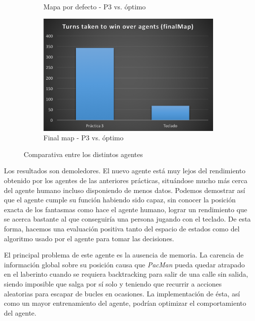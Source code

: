 \documentclass[12pt]{article}
\begin{document}
\begin{figure}[h]
\begin{subfigure}{.5\textwidth}
        \caption{Mapa por defecto - P3 vs. óptimo}
        \label{fig:sub3}
    \end{subfigure}%
    \begin{subfigure}{.5\textwidth}
        \centering
        \includegraphics[width=.85\linewidth]{fmap_d}
        \caption{Final map - P3 vs. óptimo}
        \label{fig:sub4}
    \end{subfigure}
    \caption{Comparativa entre los distintos agentes}
    \label{fig:test}
\end{figure}

Los resultados son demoledores. El nuevo agente está muy lejos del rendimiento obtenido por los agentes de las anteriores prácticas, situándose mucho más cerca del agente humano incluso disponiendo de menos datos. Podemos demostrar así que el agente cumple su función habiendo sido capaz, sin conocer la posición exacta de los fantasmas como hace el agente humano, lograr un rendimiento que se acerca bastante al que conseguiría una persona jugando con el teclado. De esta forma, hacemos una evaluación positiva tanto del espacio de estados como del algoritmo usado por el agente para tomar las decisiones.


El principal problema de este agente es la ausencia de memoria. La carencia de información global sobre su posición causa que \textit{PacMan} pueda quedar atrapado en el laberinto cuando se requiera backtracking para salir de una calle sin salida, siendo imposible que salga por sí solo y teniendo que recurrir a acciones aleatorias para escapar de bucles en ocasiones. La implementación de ésta, así como un mayor entrenamiento del agente, podrían optimizar el comportamiento del agente.
\end{document}
